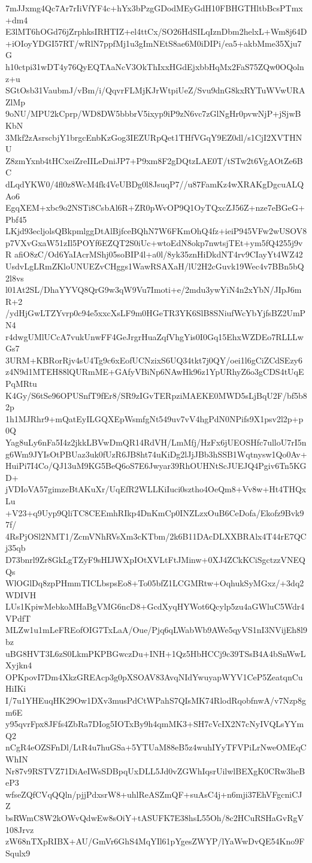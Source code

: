 7mJJxmg4Qc7Ar7rIiVfYF4c+hYx3bPzgGDodMEyGdH10FBHGTHltbBcsPTmx+dm4
E3lMT6hOGd76jZrphksIRHTIZ+el4ttCx/SO26HdSILqIznDbm2helxL+Wm8j64D
+iOIoyYDGI57RT/wRlN7ppfMj1u3gImNEtS8ae6M0iDIPi/ea5+akbMme35Xju7G
h10ctpi31wDT4y76QyEQTAaNcV3OkThIxxHGdEjxbbHqMx2FaS75ZQw0OQolnz+u
SGtOsb31VaubmJ/vBm/i/QqvrFLMjKJrWtpiUeZ/Svu9dnG8kxRYTuWVwURAZlMp
9oNU/MPU2kCprp/WD8DW5bbbrV5ixyp9iP9zN6vc7zGlNgHr0pvwNjP+jSjwBKbN
3Mkf2zAsrscbjY1brgcEnbKzGog3IEZURpQet1THfVGqY9EZ0dl/s1CjI2XVTHNU
Z8zmYxnb4tHCxeiZreIILeDniJP7+P9xm8F2gDQtzLAE0T/tSTw2t6VgAOtZe6BC
dLqdYKW0/4fl0z8WcM4fk4VeUBDg0l8JsuqP7//u87FamKz4wXRAKgDgcuALQAo6
EgqXEM+xbc9o2NSTi8CsbAl6R+ZR0pWvOP9Q1OyTQxcZJ56Z+nze7eBGeG+Pbf45
LKjd93ecljolsQBkpmlggDtAlBjfceBQhN7W6FKmOhQ4fz+ieiP945VFw2wUSOV8
p7VXvGxaW51zIl5POYf6EZQT2S0iUc+wtoEdN8okp7nwtsjTEt+ym5fQ4255j9vR
afiO8zC/Od6YaIAcrMShj05soBIP4l+a0l/8yk35znHiDkdNT4rv9CIayYt4WZ42
UsdvLgLRmZKloUNUEZvCHggs1WawRSAXaH/lU2H2cGuvk19Wec4v7BBn5bQ2l8vs
l01At2SL/DhaYYVQ8QrG9w3qW9Vu7Imoti+e/2mdu3ywYiN4n2xYbN/JIpJ6mR+2
/ydHjGwLTZYvrp0c94e5xxcXsLF9m0HGeTR3YK6SlB8SNiufWcYbYjfsBZ2UmPN4
r4dwgUMlUCcA7vukUnwFF4GeJrgrHuaZqfVhgYis0I0Gq15EhxWZDEo7RLLLwGs7
3URM+KBRorRjv4sU4Tg9c6xEofUCNzixS6UQ34tkt7j0QY/oei1l6gCiZCdSEzy6
z4N9d1MTEH88lQURmME+GAfyVBiNp6NAwHk96z1YpURhyZ6o3gCDS4tUqEPqMRtu
K4Gy/S6tSe96OPUSnfT9fEr8/SR9zIGvTERpziMAEKE0MWD5sLjBqU2F/bf5b82p
1h1MJRhr9+mQatEyILGQXEpWsmfgNt549uv7vV4hgPdN0NPifs9X1psv2l2p+p0Q
Yag8uLy6nFa5I4z2jkkLBVwDmQR14RdVH/LmMfj/HzFx6jUEOSHfc7ulloU7rI5n
g6Wm9JYIsOtPBUaz3uk0fUzR6JB8ht74uKiDg2lJjJBb3hSSB1Wqtnysw1Qo0Av+
HuiPi7I4Co/QJ13uM9KG5BeQ6oS7E6Jwyar39RhOUHNtScJUEJQ4Pgiv6Tn5KGD+
jVDIoVA57gimzeBtAKuXr/UqEfR2WLLKiIuci0sztho4OeQm8+Vv8w+Ht4THQxLu
+V23+q9Uyp9QliTC8CEEmhRIkp4DnKmCp0INZLzxOuB6CeDofa/Ekofz9Bvk97f/
4RsPjOSl2NMT1/ZcmVNhRVsXm3cKTbm/2k6B11DAcDLXXBRAlx4T44rE7QCj35qb
D73bnrl9Zr8GkLgTZyF9sHIJWXpIOtXVLtFtJMinw+0XJ4ZCkKCiSgctzzVNEQQs
WlOGlDq8zpPHmmTICLbspsEo8+To05bfZ1LCGMRtw+OqhukSyMGxz/+3dq2WDIVH
LUs1KpiwMebkoMHaBgVMG6ncD8+GcdXyqHYWot6Qcylp5zu4aGWluC5Wdr4VPdfT
MLZw1u1mLeFREofOIG7TxLaA/Oue/Pjq6qLWabWb9AWe5qyVS1nI3NVijEh8l9bz
uBG8HVT3L6zS0LkmPKPBGwczDu+INH+1Qz5HbHCCj9c39TSsB4A4bSnWwLXyjkn4
OPKpovI7Dm4XkzGREAcp3g0pXSOAV83AvqNIdYwuyapWYV1CeP5ZeatqnCuHiIKi
I/7u1YHEuqHK29Ow1DXv3musPdCtWPahS7QIsMK74RlodRqobfnwA/v7Nzp8gm6E
y95qvrFpx8JFfs4ZbRa7DIog5IOTxBy9h4qmMK3+SH7cVcIX2N7cNyIVQLsYYmQ2
nCgR4eOZSFnDl/LtR4u7huGSa+5YTUaM88eB5z4wuhIYyTFVPiLrNweOMEqCWhIN
Nr87v9RSTVZ71DiAeIWsSDBpqUxDLL5Jd0vZGWhIqsrUilwlBEXgK0CRw3heBeP3
wfseZQfCVqQQln/pjjPdxsrW8+uhlReASZmQF+suAsC4j+n6mji37EhVFgcniCJZ
bsRWmC8W2kOWvQdwEw8sOiY+tASUFK7E38hsL55Oh/8c2HCuRSHaGvRgV108Jrvz
zW68nTXpRIBX+AU/GmVr6GhS4MqYIl61pYgesZWYP/lYaWwDvQE54Kno9FSqulx9
